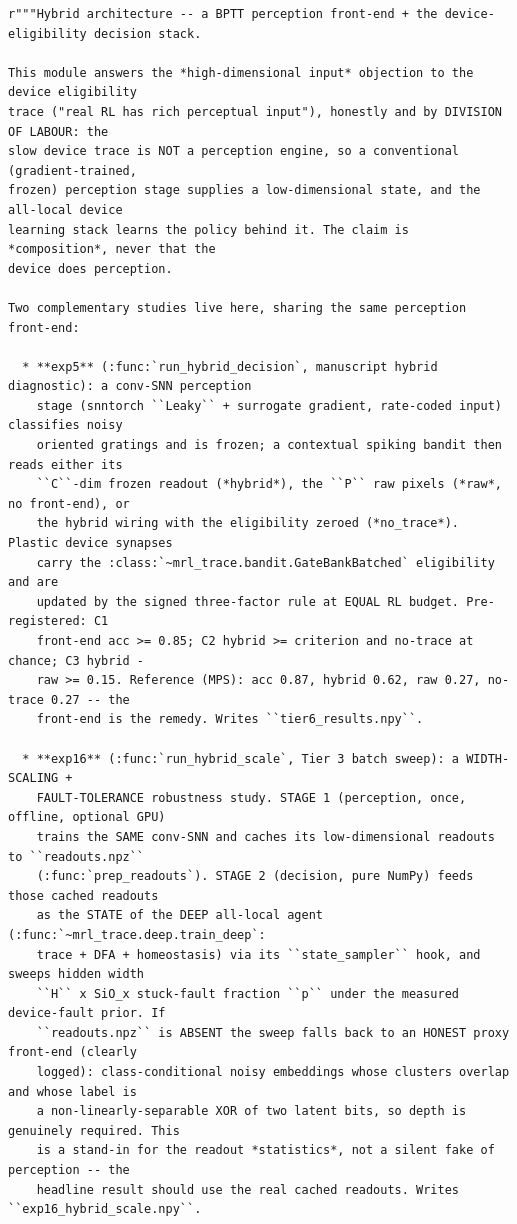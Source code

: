 \begin{lstlisting}[caption={mrl\_trace/hybrid.py},label={lst:siox-src-hybrid}]
r"""Hybrid architecture -- a BPTT perception front-end + the device-eligibility decision stack.

This module answers the *high-dimensional input* objection to the device eligibility
trace ("real RL has rich perceptual input"), honestly and by DIVISION OF LABOUR: the
slow device trace is NOT a perception engine, so a conventional (gradient-trained,
frozen) perception stage supplies a low-dimensional state, and the all-local device
learning stack learns the policy behind it. The claim is *composition*, never that the
device does perception.

Two complementary studies live here, sharing the same perception front-end:

  * **exp5** (:func:`run_hybrid_decision`, manuscript hybrid diagnostic): a conv-SNN perception
    stage (snntorch ``Leaky`` + surrogate gradient, rate-coded input) classifies noisy
    oriented gratings and is frozen; a contextual spiking bandit then reads either its
    ``C``-dim frozen readout (*hybrid*), the ``P`` raw pixels (*raw*, no front-end), or
    the hybrid wiring with the eligibility zeroed (*no_trace*). Plastic device synapses
    carry the :class:`~mrl_trace.bandit.GateBankBatched` eligibility and are
    updated by the signed three-factor rule at EQUAL RL budget. Pre-registered: C1
    front-end acc >= 0.85; C2 hybrid >= criterion and no-trace at chance; C3 hybrid -
    raw >= 0.15. Reference (MPS): acc 0.87, hybrid 0.62, raw 0.27, no-trace 0.27 -- the
    front-end is the remedy. Writes ``tier6_results.npy``.

  * **exp16** (:func:`run_hybrid_scale`, Tier 3 batch sweep): a WIDTH-SCALING +
    FAULT-TOLERANCE robustness study. STAGE 1 (perception, once, offline, optional GPU)
    trains the SAME conv-SNN and caches its low-dimensional readouts to ``readouts.npz``
    (:func:`prep_readouts`). STAGE 2 (decision, pure NumPy) feeds those cached readouts
    as the STATE of the DEEP all-local agent (:func:`~mrl_trace.deep.train_deep`:
    trace + DFA + homeostasis) via its ``state_sampler`` hook, and sweeps hidden width
    ``H`` x SiO_x stuck-fault fraction ``p`` under the measured device-fault prior. If
    ``readouts.npz`` is ABSENT the sweep falls back to an HONEST proxy front-end (clearly
    logged): class-conditional noisy embeddings whose clusters overlap and whose label is
    a non-linearly-separable XOR of two latent bits, so depth is genuinely required. This
    is a stand-in for the readout *statistics*, not a silent fake of perception -- the
    headline result should use the real cached readouts. Writes ``exp16_hybrid_scale.npy``.


\end{lstlisting}
